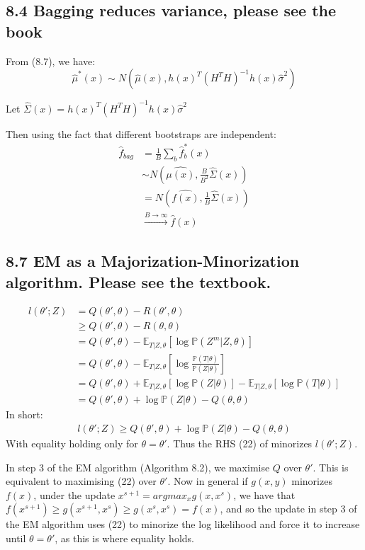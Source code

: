\subsection*{8.4 Bagging reduces variance, please see the book}
From (8.7), we have:
$$\hat{\mu}^*(x) \sim N(\hat{\mu}(x), h(x)^T (H^T H)^{-1}h(x) \hat{\sigma}^2)$$

Let $\hat{\Sigma}(x) = h(x)^T (H^T H)^{-1}h(x) \hat{\sigma}^2$

Then using the fact that different bootstraps are independent:
\begin{align*}
    \hat{f}_{bag} &= \frac{1}{B} \sum_{b} \hat{f}^*_b(x) \\
     &\sim N(\hat{\mu(x)}, \frac{B}{B^2} \hat{\Sigma}(x)) \\
     &= N(\hat{f(x)}, \frac{1}{B} \hat{\Sigma}(x))\\
     &\xrightarrow{B\to\infty} \hat{f}(x)
\end{align*}

\subsection*{8.7 EM as a Majorization-Minorization algorithm. Please see the textbook.}


\begin{align*}
    l(\theta'; Z) &= Q(\theta', \theta) - R(\theta', \theta) \\
    &\geq Q(\theta', \theta) - R(\theta, \theta) \\
   &= Q(\theta', \theta) - \mathbb{E}_{T|Z, \theta}\left[\log \mathbb{P}\left(Z^m|Z, \theta\right)\right]\\
   &= Q(\theta', \theta) - \mathbb{E}_{T|Z, \theta}\left[\log \frac{\mathbb{P}\left(T|\theta\right)}{\mathbb{P}\left(Z|\theta\right)}\right] \\
   &= Q(\theta', \theta) + \mathbb{E}_{T|Z, \theta}\left[\log \mathbb{P}\left(Z|\theta\right)\right]- \mathbb{E}_{T|Z, \theta}\left[\log \mathbb{P}\left(T|\theta\right)\right]\\
   &= Q(\theta', \theta) + \log \mathbb{P}\left(Z|\theta\right) - Q(\theta, \theta)
\end{align*}
In short:
\begin{align}
l(\theta'; Z) \geq Q(\theta', \theta) + \log \mathbb{P}\left(Z|\theta\right) - Q(\theta, \theta)
\end{align}
With equality holding only for $\theta = \theta'$. Thus the RHS (22) of minorizes $l(\theta'; Z)$.

In step 3 of the EM algorithm (Algorithm 8.2), we maximise $Q$ over $\theta'$. This is equivalent to maximising (22) over $\theta'$.
Now in general if $g(x,y)$ minorizes $f(x)$, under the update $x^{s+1} = argmax_x g(x,x^s)$,
we have that $f(x^{s+1}) \geq g(x^{s+1},x^s)\geq g(x^s,x^s) = f(x)$, and so the update in step 3 of the EM algorithm uses (22)  to minorize the log likelihood and force it to increase until $\theta = \theta'$, as this is where equality holds.
